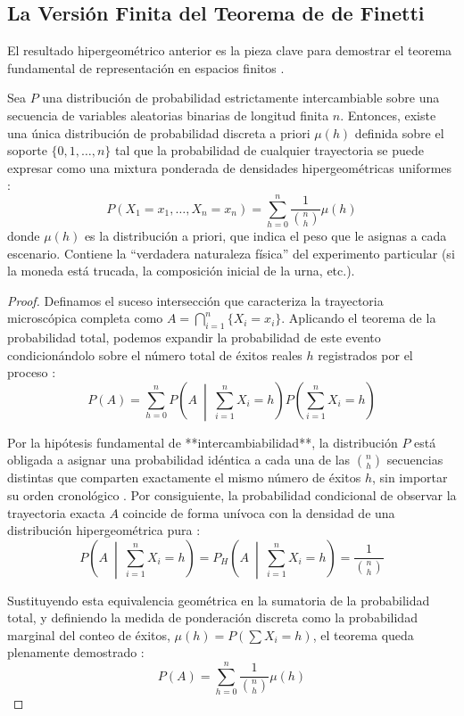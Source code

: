 \subsection{La Versión Finita del Teorema de de Finetti}

El resultado hipergeométrico anterior es la pieza clave para demostrar el teorema fundamental de representación en espacios finitos .

\begin{teo}
Sea $P$ una distribución de probabilidad estrictamente intercambiable sobre una secuencia de variables aleatorias binarias de longitud finita $n$. Entonces, existe una única distribución de probabilidad discreta a priori $\mu(h)$ definida sobre el soporte $\{0, 1, \dots, n\}$ tal que la probabilidad de cualquier trayectoria se puede expresar como una mixtura ponderada de densidades hipergeométricas uniformes :
\begin{equation*}
    P(X_1 = x_1, \dots, X_n = x_n) = \sum_{h=0}^{n} \frac{1}{\binom{n}{h}} \mu(h)
\end{equation*}
donde $\mu(h)$ es la distribución a priori, que indica el peso que le asignas a cada escenario. Contiene la ``verdadera naturaleza física'' del experimento particular (si la moneda está trucada, la composición inicial de la urna, etc.).
\end{teo}

\begin{proof}
Definamos el suceso intersección que caracteriza la trayectoria microscópica completa como $A = \bigcap_{i=1}^{n} \{X_i = x_i\}$. Aplicando el teorema de la probabilidad total, podemos expandir la probabilidad de este evento condicionándolo sobre el número total de éxitos reales $h$ registrados por el proceso :
\begin{equation*}
    P(A) = \sum_{h=0}^{n} P\left(A \ \middle| \ \sum_{i=1}^{n} X_i = h\right) P\left(\sum_{i=1}^{n} X_i = h\right)
\end{equation*}

Por la hipótesis fundamental de **intercambiabilidad**, la distribución $P$ está obligada a asignar una probabilidad idéntica a cada una de las $\binom{n}{h}$ secuencias distintas que comparten exactamente el mismo número de éxitos $h$, sin importar su orden cronológico . Por consiguiente, la probabilidad condicional de observar la trayectoria exacta $A$ coincide de forma unívoca con la densidad de una distribución hipergeométrica pura :
\begin{equation*}
    P\left(A \ \middle| \ \sum_{i=1}^{n} X_i = h\right) = P_H\left(A \ \middle| \ \sum_{i=1}^{n} X_i = h\right) = \frac{1}{\binom{n}{h}}
\end{equation*}

Sustituyendo esta equivalencia geométrica en la sumatoria de la probabilidad total, y definiendo la medida de ponderación discreta como la probabilidad marginal del conteo de éxitos, $\mu(h) = P\left(\sum X_i = h\right)$, el teorema queda plenamente demostrado :
\begin{equation*}
    P(A) = \sum_{h=0}^{n} \frac{1}{\binom{n}{h}} \mu(h)
\end{equation*}
\end{proof}

